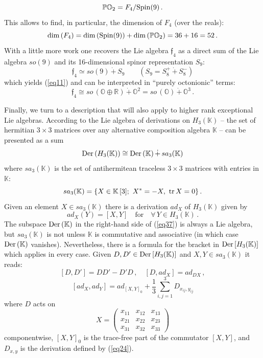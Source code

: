 \documentclass{article}
\newcommand{\be}{\begin{equation}}
\newcommand{\ee}{\end{equation}}
\begin{document}
\be
\label{eq33}
{\mathbb P} {\mathbb O}_2 = F_4 / {\rm Spin} (9) \, .
\ee
This allows to find, in  particular, the dimension of $F_4$ (over the reals):
\be
\label{eq34}
\dim \, (F_4) = \dim \, ({\rm Spin} (9)) + \dim \, ({\mathbb P} {\mathbb O}_2) = 36 + 16 = 52 \, .
\ee
With a little more work one recovers the Lie algebra ${\mathfrak f}_4$ as a direct sum of the Lie algebra $so (9)$ and its 16-dimensional spinor representation $S_9$:
\be
\label{eq35}
{\mathfrak f}_4 \simeq so (9) \, \dot + \, S_9 \qquad (S_9 = S_8^+ \, \dot + \, S_8^-)
\ee
which yields (\ref{eq11}) and can be interpreted in ``purely octonionic'' terms:
\be
\label{eq36}
{\mathfrak f}_4 \cong so \, ({\mathbb O} \oplus {\mathbb R}) \, \dot + \, {\mathbb O}^2 = so \, ({\mathbb O}) \, \dot + \, {\mathbb O}^3 \, .
\ee

Finally, we turn to a description that will also apply to higher rank exceptional Lie algebras. According to \cite{BS} the Lie algebra of derivations on $H_3 ({\mathbb K})$ -- the set of hermitian $3 \times 3$ matrices over any alternative composition algebra ${\mathbb K}$ -- can be presented as a sum
\be
\label{eq37}
{\rm Der} \, (H_3 ({\mathbb K})) \cong {\rm Der} \, ({\mathbb K}) \, \dot + \, sa_3 ({\mathbb K})
\ee
where $sa_3 ({\mathbb K})$ is the set of antihermitean traceless $3 \times 3$ matrices with entries in ${\mathbb K}$:
\be
\label{eq38}
sa_3 ({\mathbb K}) = \{ X \in {\mathbb K} \, [3] ; \ X^* = -X , \ {\rm tr} \, X = 0 \} \, .
\ee
Given an element $X \in sa_3 ({\mathbb K})$ there is a derivation $ad_X$ of $H_3 ({\mathbb K})$ given by
\be
\label{eq39}
ad_X (Y) = [X,Y] \quad \mbox{for} \quad \forall \, Y \in H_3 ({\mathbb K}) \, .
\ee
The subspace ${\rm Der} \, ({\mathbb K})$ in the right-hand side of (\ref{eq37}) is always a Lie algebra, but $sa_3 ({\mathbb K})$ is not unless ${\mathbb K}$ is commutative and associative (in which case ${\rm Der} \, ({\mathbb K})$ vanishes). Nevertheless, there is a formula for the bracket in ${\rm Der} \, [H_3({\mathbb K})]$ which applies in every case. Given $D,D' \in {\rm Der} \, [H_3({\mathbb K})]$ and $X,Y \in sa_3 ({\mathbb K})$ it reads:
$$
[D,D'] = DD' - D'D \, , \quad [D,ad_X] = ad_{DX} \, ,
$$
\be
\label{eq310}
[ad_X , ad_Y] = ad_{[X,Y]_0} + \frac13 \sum_{i,j=1}^3 D_{x_{ij} , y_{ij}}
\ee
where $D$ acts on
$$
X = \begin{pmatrix}
x_{11} &x_{12} &x_{13} \\
x_{21} &x_{22} &x_{23} \\
x_{31} &x_{32} &x_{33} 
\end{pmatrix}
$$
componentwise, $[X,Y]_0$ is the trace-free part of the commutator $[X,Y]$, and $D_{x,y}$ is the derivation defined by (\ref{eq24}).
\end{document}
